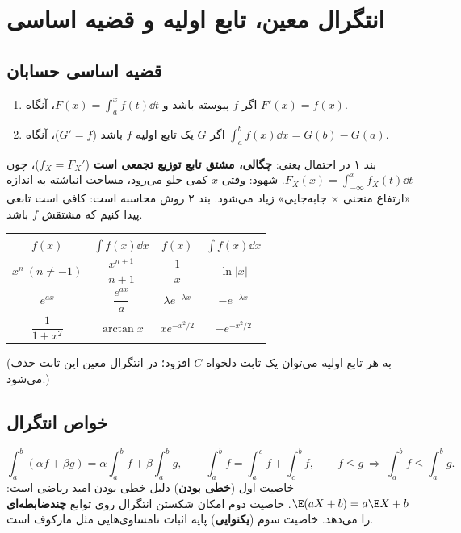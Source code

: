 \section{انتگرال معین، تابع اولیه و قضیه اساسی}

\subsection{قضیه اساسی حسابان}
\begin{theorem}
\begin{enumerate}
\item اگر $f$ پیوسته باشد و $F(x)=\int_a^xf(t)\dd t$، آنگاه $F'(x)=f(x)$.
\item اگر $G$ یک تابع اولیه $f$ باشد ($G'=f$)، آنگاه $\int_a^bf(x)\dd x=G(b)-G(a)$.
\end{enumerate}
\end{theorem}
بند ۱ در احتمال یعنی: \textbf{چگالی، مشتق تابع توزیع تجمعی است} ($f_X=F_X'$)، چون $F_X(x)=\int_{-\infty}^xf_X(t)\dd t$. شهود: وقتی $x$ کمی جلو می‌رود، مساحت انباشته به اندازه «ارتفاع منحنی × جابه‌جایی» زیاد می‌شود. بند ۲ روش محاسبه است: کافی است تابعی پیدا کنیم که مشتقش $f$ باشد.

\begin{center}
\renewcommand{\arraystretch}{1.6}
\begin{tabular}{c|c||c|c}
$f(x)$ & $\int f(x)\dd x$ & $f(x)$ & $\int f(x)\dd x$\\\hline
$x^n\ (n\neq-1)$ & $\dfrac{x^{n+1}}{n+1}$ & $\dfrac1x$ & $\ln|x|$\\
$e^{ax}$ & $\dfrac{e^{ax}}{a}$ & $\lambda e^{-\lambda x}$ & $-e^{-\lambda x}$\\
$\dfrac1{1+x^2}$ & $\arctan x$ & $xe^{-x^2/2}$ & $-e^{-x^2/2}$
\end{tabular}
\end{center}
(به هر تابع اولیه می‌توان یک ثابت دلخواه $C$ افزود؛ در انتگرال معین این ثابت حذف می‌شود.)

\subsection{خواص انتگرال}
\[
\int_a^b(\alpha f+\beta g)=\alpha\int_a^bf+\beta\int_a^bg,\qquad
\int_a^bf=\int_a^cf+\int_c^bf,\qquad
f\le g\ \Rightarrow\ \int_a^bf\le\int_a^bg .
\]
خاصیت اول (\textbf{خطی بودن}) دلیل خطی بودن امید ریاضی است: $\E(aX+b)=a\E X+b$. خاصیت دوم امکان شکستن انتگرال روی توابع \textbf{چندضابطه‌ای} را می‌دهد. خاصیت سوم (\textbf{یکنوایی}) پایه اثبات نامساوی‌هایی مثل مارکوف است.

